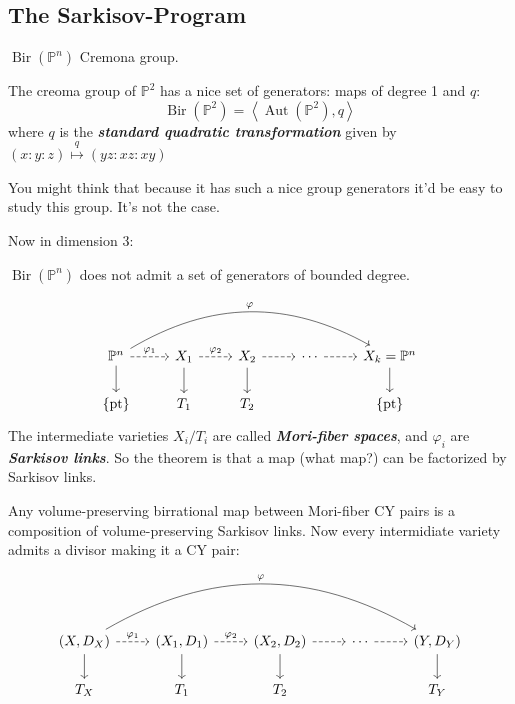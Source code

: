 \subsection{The Sarkisov-Program}

\(\operatorname{Bir}(\mathbb{P}^n)\) Cremona group.

\begin{thm}\leavevmode
The creoma group of \(\mathbb{P}^2\) has a nice set of generators: maps of degree 1 and \(q\):
\[\operatorname{Bir}(\mathbb{P}^2) = \left<\operatorname{Aut}(\mathbb{P}^2),q\right>\]
where \(q\) is the \textit{\textbf{standard quadratic transformation}} given by \((x:y:z) \overset{q}{\mapsto }(yz:xz:xy)\)
\end{thm}

You might think that because it has such a nice group generators it'd be easy to study this group. It's not the case.

Now in dimension 3:

\begin{thm}\leavevmode
\(\operatorname{Bir}(\mathbb{P}^n)\) does not admit a set of generators of bounded degree.
\end{thm}

\begin{thm}\leavevmode
	\[\begin{tikzcd}
		\mathbb{P}^n\arrow[r,dashed,"\varphi_1"]\arrow[d]\arrow[rrrr,bend left,"\varphi"]&X_1\arrow[r,dashed,"\varphi_2"]\arrow[d]&X_2\arrow[r,dashed]\arrow[d]&\cdots \arrow[r,dashed]&X_k=\mathbb{P}^n\arrow[d]\\
	\{\operatorname{pt}\}	&T_1&T_2&&\{\operatorname{pt}\}
	\end{tikzcd}\]
The intermediate varieties \(X_i/T_i\) are called \textit{\textbf{Mori-fiber spaces}}, and \(\varphi_i\) are \textit{\textbf{Sarkisov links}}. So the theorem is that a map (what map?) can be factorized by Sarkisov links.
\end{thm}

\begin{thm}\leavevmode
Any volume-preserving birrational map between Mori-fiber CY pairs is a composition of volume-preserving Sarkisov links. Now every intermidiate variety admits a divisor making it a CY pair:
	\[\begin{tikzcd}
		(X,D_X)\arrow[r,dashed,"\varphi_1"]\arrow[d]\arrow[rrrr,bend left,"\varphi"]&(X_1,D_1)\arrow[r,dashed,"\varphi_2"]\arrow[d]&(X_2,D_2)\arrow[r,dashed]\arrow[d]&\cdots \arrow[r,dashed]&(Y,D_Y)\arrow[d]\\
	T_X	&T_1&T_2&&T_Y
	\end{tikzcd}\]
\end{thm}

